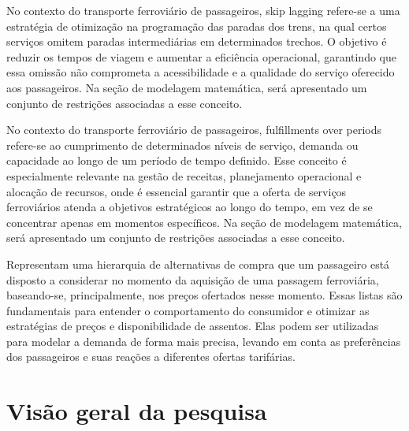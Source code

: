 \begin{description}[style=unboxed, leftmargin=0cm]
	\item[Skip lagging:] No contexto do transporte ferroviário de passageiros, skip lagging refere-se a uma estratégia de otimização na programação das paradas dos trens, na qual certos serviços omitem paradas intermediárias em determinados trechos. O objetivo é reduzir os tempos de viagem e aumentar a eficiência operacional, garantindo que essa omissão não comprometa a acessibilidade e a qualidade do serviço oferecido aos passageiros. Na seção de modelagem matemática, será apresentado um conjunto de restrições associadas a esse conceito.

	\item[Fulfillments over periods:] No contexto do transporte ferroviário de passageiros, fulfillments over periods refere-se ao cumprimento de determinados níveis de serviço, demanda ou capacidade ao longo de um período de tempo definido. Esse conceito é especialmente relevante na gestão de receitas, planejamento operacional e alocação de recursos, onde é essencial garantir que a oferta de serviços ferroviários atenda a objetivos estratégicos ao longo do tempo, em vez de se concentrar apenas em momentos específicos. Na seção de modelagem matemática, será apresentado um conjunto de restrições associadas a esse conceito.

	\item[Listas de preferência:] Representam uma hierarquia de alternativas de compra que um passageiro está disposto a considerar no momento da aquisição de uma passagem ferroviária, baseando-se, principalmente, nos preços ofertados nesse momento. Essas listas são fundamentais para entender o comportamento do consumidor e otimizar as estratégias de preços e disponibilidade de assentos. Elas podem ser utilizadas para modelar a demanda de forma mais precisa, levando em conta as preferências dos passageiros e suas reações a diferentes ofertas tarifárias.
\end{description}

\section{Visão geral da pesquisa}

